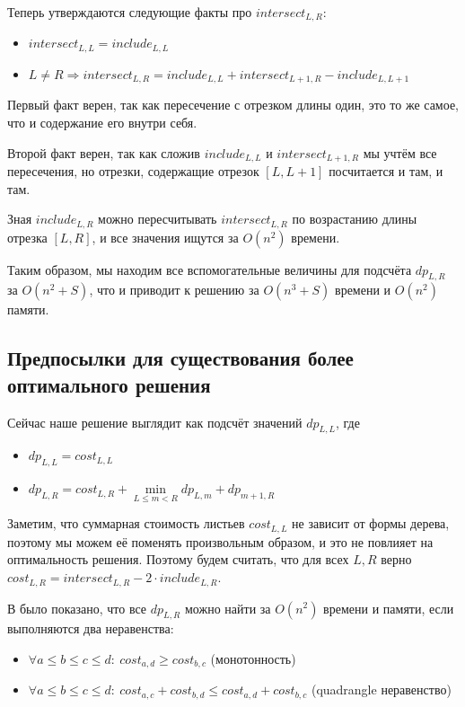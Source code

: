 Теперь утверждаются следующие факты про $intersect_{L, R}$:

\begin{itemize}
    \item $intersect_{L, L} = include_{L, L}$
    \item $L \ne R \Rightarrow intersect_{L, R} = include_{L, L} + intersect_{L + 1, R} - include_{L, L + 1}$
\end{itemize}

Первый факт верен, так как пересечение с отрезком длины один, это то же самое, что и содержание его внутри себя.

Второй факт верен, так как сложив $include_{L, L}$ и $intersect_{L + 1, R}$ мы учтём все пересечения, но отрезки, содержащие отрезок $[L, L + 1]$ посчитается и там, и там.

Зная $include_{L, R}$ можно пересчитывать $intersect_{L, R}$ по возрастанию длины отрезка $[L, R]$, и все значения ищутся за $O(n^2)$ времени.

Таким образом, мы находим все вспомогательные величины для подсчёта $dp_{L, R}$ за $O(n^2 + S)$, что и приводит к решению за $O(n^3 + S)$ времени и $O(n^2)$ памяти.

\subsection{Предпосылки для существования более оптимального решения}

Сейчас наше решение выглядит как подсчёт значений $dp_{L, L}$, где

\begin{itemize}
    \item $dp_{L, L} = cost_{L, L}$
    \item $dp_{L, R} = cost_{L, R} + \min \limits_{L \leqslant m < R} {dp_{L, m} + dp_{m + 1, R}}$
\end{itemize}

Заметим, что суммарная стоимость листьев $cost_{L, L}$ не зависит от формы дерева, поэтому мы можем её поменять произвольным образом, и это не повлияет на оптимальность решения. Поэтому будем считать, что для всех $L, R$ верно $cost_{L, R} = intersect_{L, R} - 2 \cdot include_{L, R}$.

В \cite{yao1980} было показано, что все $dp_{L, R}$ можно найти за $O(n^2)$ времени и памяти, если выполняются два неравенства:

\begin{itemize}
    \item $\forall a \leqslant b \leqslant c \leqslant d:\ cost_{a, d} \geqslant cost_{b, c}$ (монотонность)
    \item $\forall a \leqslant b \leqslant c \leqslant d:\ cost_{a, c} + cost_{b, d} \leqslant cost_{a, d} + cost_{b, c}$ (quadrangle неравенство)
\end{itemize}

